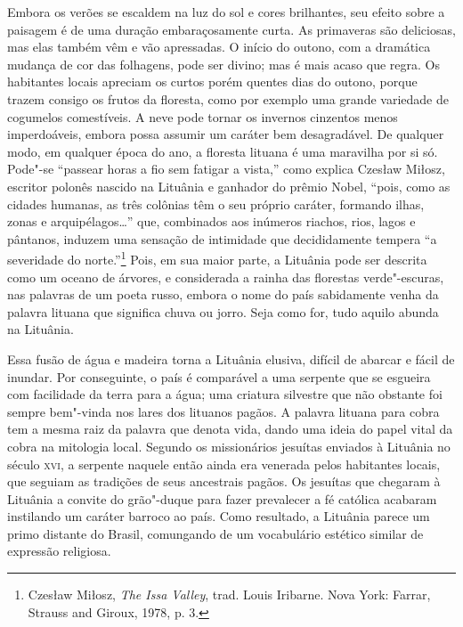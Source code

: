Embora os verões se escaldem na luz do sol e cores
brilhantes, seu efeito sobre a paisagem é de uma duração embaraçosamente
curta. As primaveras são deliciosas, mas elas também vêm e vão
apressadas. O início do outono, com a dramática mudança de cor das
folhagens, pode ser divino; mas é mais acaso que regra. Os habitantes
locais apreciam os curtos porém quentes dias do outono, porque trazem
consigo os frutos da floresta, como por exemplo uma grande variedade de
cogumelos comestíveis. A neve pode tornar os invernos cinzentos menos
imperdoáveis, embora possa assumir um caráter bem desagradável. De
qualquer modo, em qualquer época do ano, a floresta lituana é uma
maravilha por si só. Pode"-se ``passear horas a fio sem fatigar a
vista,'' como explica Czesław Miłosz, escritor polonês nascido na
Lituânia e ganhador do prêmio Nobel, ``pois, como as cidades humanas, as
três colônias têm o seu próprio caráter, formando ilhas, zonas e
arquipélagos\ldots{}'' que, combinados aos inúmeros riachos, rios, lagos
e pântanos, induzem uma sensação de intimidade que decididamente tempera
``a severidade do norte.''\footnote{Czesław Miłosz, \textit{The Issa
  Valley}, trad. Louis Iribarne. Nova York: Farrar, Strauss and
  Giroux, 1978, p. 3.} Pois, em sua maior parte, a Lituânia pode ser
descrita como um oceano de árvores, e considerada a rainha das florestas
verde"-escuras, nas palavras de um poeta russo, embora o nome do país
sabidamente venha da palavra lituana que significa chuva ou jorro. Seja
como for, tudo aquilo abunda na Lituânia.

Essa fusão de água e madeira torna a Lituânia elusiva, difícil de
abarcar e fácil de inundar. Por conseguinte, o país é comparável a uma
serpente que se esgueira com facilidade da terra para a água; uma
criatura silvestre que não obstante foi sempre bem"-vinda nos lares dos
lituanos pagãos. A palavra lituana para cobra tem a mesma raiz da
palavra que denota vida, dando uma ideia do papel vital da cobra na
mitologia local. Segundo os missionários jesuítas enviados à Lituânia no
século \textsc{xvi}, a serpente naquele então ainda era venerada pelos
habitantes locais, que seguiam as tradições de seus ancestrais pagãos.
Os jesuítas que chegaram à Lituânia a convite do grão"-duque para fazer
prevalecer a fé católica acabaram instilando um caráter barroco ao país.
Como resultado, a Lituânia parece um primo distante do Brasil,
comungando de um vocabulário estético similar de expressão religiosa.

